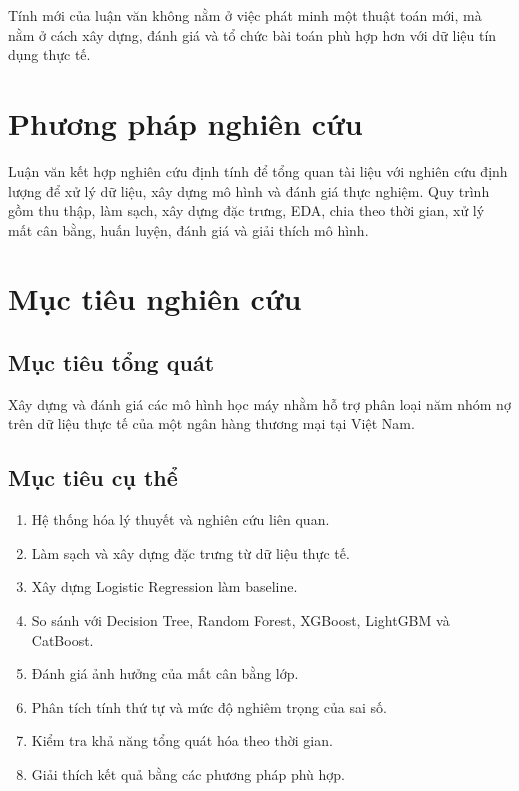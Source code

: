 Tính mới của luận văn không nằm ở việc phát minh một thuật toán mới, mà nằm ở cách xây dựng, đánh giá và tổ chức bài toán phù hợp hơn với dữ liệu tín dụng thực tế.

\section{Phương pháp nghiên cứu}

Luận văn kết hợp nghiên cứu định tính để tổng quan tài liệu với nghiên cứu định lượng để xử lý dữ liệu, xây dựng mô hình và đánh giá thực nghiệm. Quy trình gồm thu thập, làm sạch, xây dựng đặc trưng, EDA, chia theo thời gian, xử lý mất cân bằng, huấn luyện, đánh giá và giải thích mô hình.

\section{Mục tiêu nghiên cứu}

\subsection{Mục tiêu tổng quát}

Xây dựng và đánh giá các mô hình học máy nhằm hỗ trợ phân loại năm nhóm nợ trên dữ liệu thực tế của một ngân hàng thương mại tại Việt Nam.

\subsection{Mục tiêu cụ thể}

\begin{enumerate}
    \item Hệ thống hóa lý thuyết và nghiên cứu liên quan.
    \item Làm sạch và xây dựng đặc trưng từ dữ liệu thực tế.
    \item Xây dựng Logistic Regression làm baseline.
    \item So sánh với Decision Tree, Random Forest, XGBoost, LightGBM và CatBoost.
    \item Đánh giá ảnh hưởng của mất cân bằng lớp.
    \item Phân tích tính thứ tự và mức độ nghiêm trọng của sai số.
    \item Kiểm tra khả năng tổng quát hóa theo thời gian.
    \item Giải thích kết quả bằng các phương pháp phù hợp.
\end{enumerate}

